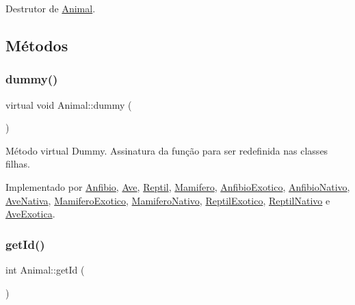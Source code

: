 Destrutor de \hyperlink{classAnimal}{Animal}. 

\subsection{Métodos}
\mbox{\label{classAnimal_a88fa81bb01530eaa71656b678bf05b5b}} 
\subsubsection{\texorpdfstring{dummy()}{dummy()}}
{\footnotesize\ttfamily virtual void Animal\+::dummy (\begin{DoxyParamCaption}{ }\end{DoxyParamCaption})\hspace{0.3cm}{\ttfamily [pure virtual]}}

Método virtual Dummy. Assinatura da função para ser redefinida nas classes filhas. 

Implementado por \hyperlink{classAnfibio_a5f92eac4e6add9b2798119cc38dda093}{Anfibio}, \hyperlink{classAve_a9cf98dd6d66c29bc4d8e4f23992ead9c}{Ave}, \hyperlink{classReptil_acfbb0461fc05ec7b08332dd4cee122c6}{Reptil}, \hyperlink{classMamifero_a8f2a488b1796d3ccf0ff9e1c5a82af05}{Mamifero}, \hyperlink{classAnfibioExotico_a192645b6588bc584145f70be14862d77}{Anfibio\+Exotico}, \hyperlink{classAnfibioNativo_ace45796a9ce43d12b992182643aeb94e}{Anfibio\+Nativo}, \hyperlink{classAveNativa_ad4af9772d84390bc0646dcfc9cd931ee}{Ave\+Nativa}, \hyperlink{classMamiferoExotico_a0198a13cb62c2400c3a1e9e8a3ddc792}{Mamifero\+Exotico}, \hyperlink{classMamiferoNativo_a79092135d515ffb00c24dcc8bc073acc}{Mamifero\+Nativo}, \hyperlink{classReptilExotico_aa59602e743a05deba4f1ff2fa453607a}{Reptil\+Exotico}, \hyperlink{classReptilNativo_a72582fd1adb5d8d562354ab35e574b3b}{Reptil\+Nativo} e \hyperlink{classAveExotica_add68b24041e28ade517eb42783da81a8}{Ave\+Exotica}.

\mbox{\label{classAnimal_a2c27e56355bc2b40d65250da2bb8a102}} 
\subsubsection{\texorpdfstring{get\+Id()}{getId()}}
{\footnotesize\ttfamily int Animal\+::get\+Id (\begin{DoxyParamCaption}{ }\end{DoxyParamCaption})}

